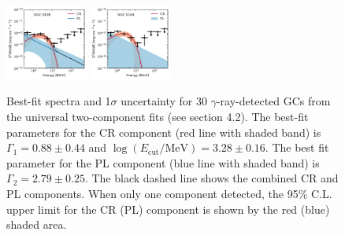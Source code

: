 \documentclass[doublespace,draft,nopageskip]{VTthesis} %
\begin{document}
\begin{appendices}
\begin{figure}
\includegraphics[width=0.24\textwidth]{Figures/Globular/spectra/2comp_25.pdf}
\includegraphics[width=0.24\textwidth]{Figures/Globular/spectra/2comp_12.pdf}
\caption{Best-fit spectra and 1$\sigma$ uncertainty for 30 $\gamma$-ray-detected GCs from the universal two-component fits (see section 4.2). The best-fit parameters for the CR component (red line with shaded band) is $\Gamma_1 = 0.88 \pm 0.44$ and $\log(E_\mathrm{cut}/\mathrm{MeV})=3.28 \pm 0.16$. The best fit parameter for the {PL} component (blue line with shaded band) is $\Gamma_2 = 2.79 \pm 0.25$. 
The black dashed line shows the combined CR and {PL} components. When only one component detected, the 95\% C.L. upper limit for the CR ({PL}) component is shown by the red (blue) shaded area.}
\label{fig:2comp}
\end{figure}


\end{appendices}
\end{document}
